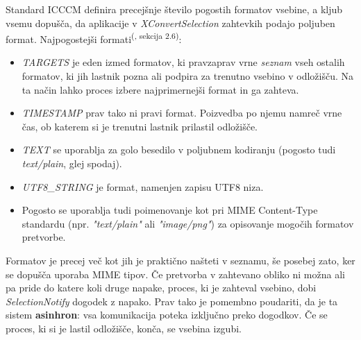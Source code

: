 \documentclass[12pt, A4]{article}
\begin{document}
	
	Standard ICCCM definira precejšnje število pogostih formatov vsebine, a kljub vsemu dopušča, da aplikacije v \textit{XConvertSelection} zahtevkih podajo poljuben format.
	Najpogostejši formati\textsuperscript{(\cite{icccm}, sekcija 2.6)}:
	\begin{itemize}
		\item \textit{TARGETS} je eden izmed formatov, ki pravzaprav vrne \textit{seznam} vseh ostalih formatov, ki jih lastnik pozna ali podpira za trenutno vsebino v odložišču. Na ta način lahko proces izbere najprimernejši format in ga zahteva.
		\item \textit{TIMESTAMP} prav tako ni pravi format. Poizvedba po njemu namreč vrne čas, ob katerem si je trenutni lastnik prilastil odložišče.
		
		\item \textit{TEXT} se uporablja za golo besedilo v poljubnem kodiranju (pogosto tudi \textit{text/plain}, glej spodaj).
		\item \textit{UTF8\_STRING} je format, namenjen zapisu UTF8 niza.
		\item Pogosto se uporablja tudi poimenovanje kot pri MIME Content-Type standardu (npr. \textit{"text/plain"} ali \textit{"image/png"}) za opisovanje mogočih formatov pretvorbe.
	\end{itemize}
	
	\pagebreak
	Formatov je precej več kot jih je praktično našteti v seznamu, še posebej zato, ker se dopušča uporaba MIME tipov. Če pretvorba v zahtevano obliko ni možna ali pa pride do katere koli druge napake, proces, ki je zahteval vsebino, dobi \textit{SelectionNotify} dogodek z napako. Prav tako je pomembno poudariti, da je ta sistem \textbf{asinhron}: vsa komunikacija poteka izključno preko dogodkov. Če se proces, ki si je lastil odložišče, konča, se vsebina izgubi.
	
\end{document}
